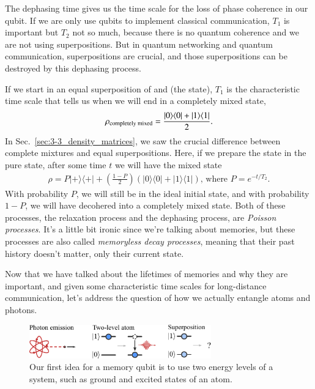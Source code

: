 The dephasing time gives us the time scale for the loss of phase coherence in our qubit. If we are only use qubits to implement classical communication,  $T_1$ is important but  $T_2$ not so much, because there is no quantum coherence and we are not using superpositions. But in quantum networking and quantum communication, superpositions are crucial, and those superpositions can be destroyed by this dephasing process.

If we start in an equal superposition of  and  (the \ket{+} state), $T_1$ is the characteristic time scale that tells us when we will end in a completely mixed state,
\begin{equation}
\begin{aligned}
\rho_{\textrm{completely mixed}} =\frac{|0 \rangle \langle 0|+|1 \rangle \langle 1|}{2}.
\end{aligned}
\end{equation}
In Sec.~\ref{sec:3-3_density_matrices}, we saw the crucial difference between complete mixtures and equal superpositions. Here, if we prepare the state in the pure state, after some time $t$ we will have the mixed state
\begin{equation}
\begin{aligned}
\rho=P|+\rangle\langle+|+\left(\frac{1-P}{2}\right)(|0\rangle\langle 0|+| 1\rangle\langle 1|)\text{, where }  P=e^{-t / T_2}.
\end{aligned}
\end{equation}
With probability $P$, we will still be in the ideal initial state, and with probability $1-P$, we will have decohered into a completely mixed state. Both of these processes, the relaxation process and the dephasing process, are \emph{Poisson processes}. It's a little bit ironic since we're talking about memories, but these processes are also called \emph{memoryless decay processes}, meaning that their past history doesn't matter, only their current state.

Now that we have talked about the lifetimes of memories and why they are important, and given some characteristic time scales for long-distance communication, let's address the question of how we actually entangle atoms and photons.

\begin{figure}[t]
    \centering
    \includegraphics[width=0.7\textwidth]{lesson13/13-4_memory-first.pdf}
    \caption[First idea for memory]{Our first idea for a memory qubit is to use two energy levels of a system, such as ground and excited states of an atom.}
    \label{fig:13-memory-first}
\end{figure}

